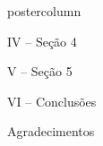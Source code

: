 \begin{column}{.54\textwidth}
	\begin{beamercolorbox}[center,wd=\textwidth]{postercolumn}
		\begin{minipage}[T]{.95\textwidth}
			\parbox[t][\columnheight]{\textwidth}{
				\begin{block}{\vspace*{-7pt} \large IV -- Seção 4}	
				\end{block}
				
				\vspace*{14pt}
				
				\begin{block}{\vspace*{-7pt} \large V -- Seção 5}		
				\end{block}
				
				\vspace*{14pt}
				
				\begin{block}{\vspace*{-7pt} \large VI -- Conclusões}
				\end{block}	 
				
				\vspace*{14pt}
				
				\begin{block}{\vspace*{-7pt} \large Agradecimentos}
				\end{block}	
			}
		\end{minipage}
	\end{beamercolorbox}
\end{column}